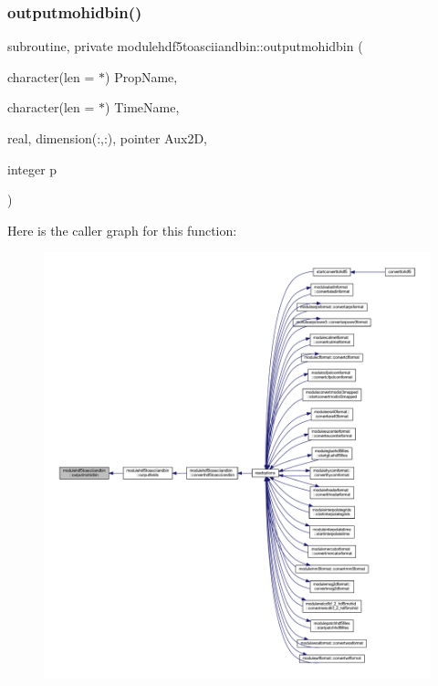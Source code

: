 \subsubsection{\texorpdfstring{outputmohidbin()}{outputmohidbin()}}
{\footnotesize\ttfamily subroutine, private modulehdf5toasciiandbin\+::outputmohidbin (\begin{DoxyParamCaption}\item[{character(len = $\ast$)}]{Prop\+Name,  }\item[{character(len = $\ast$)}]{Time\+Name,  }\item[{real, dimension(\+:,\+:), pointer}]{Aux2D,  }\item[{integer}]{p }\end{DoxyParamCaption})\hspace{0.3cm}{\ttfamily [private]}}

Here is the caller graph for this function\+:\nopagebreak
\begin{figure}[H]
\begin{center}
\leavevmode
\includegraphics[width=350pt]{namespacemodulehdf5toasciiandbin_aff18abddac541bb4eb02be3abb3aa389_icgraph}
\end{center}
\end{figure}
\mbox{\label{namespacemodulehdf5toasciiandbin_ad9bbff03f3e4066dec1d8a161e2d0be4}} 
